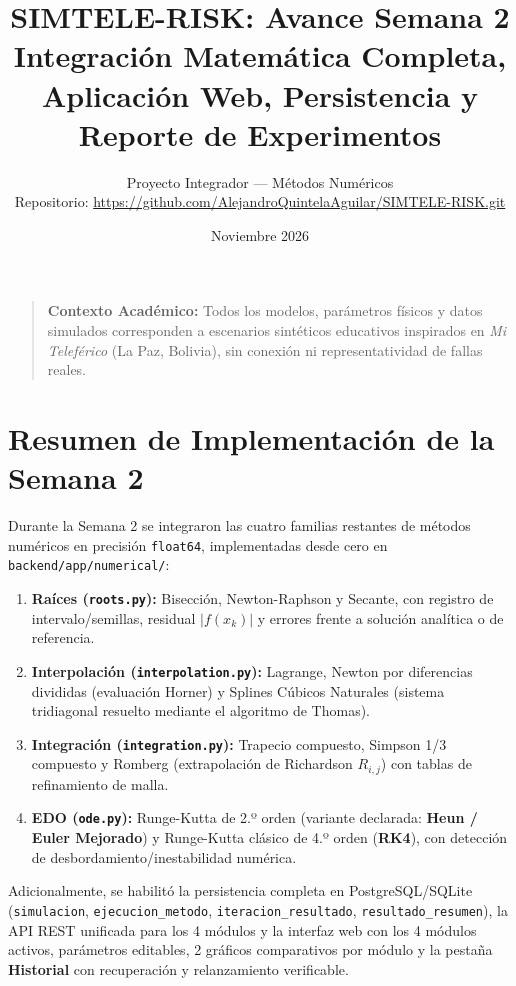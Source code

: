 \documentclass[11pt,a4paper]{article}
\title{\textbf{SIMTELE-RISK: Avance Semana 2} \\
\large Integración Matemática Completa, Aplicación Web, Persistencia y Reporte de Experimentos}
\author{Proyecto Integrador — Métodos Numéricos \\
Repositorio: \url{https://github.com/AlejandroQuintelaAguilar/SIMTELE-RISK.git}}
\date{Noviembre 2026}
\begin{document}
\maketitle

\begin{quote}
\textbf{Contexto Académico:} Todos los modelos, parámetros físicos y datos simulados corresponden a escenarios sintéticos educativos inspirados en \textit{Mi Teleférico} (La Paz, Bolivia), sin conexión ni representatividad de fallas reales.
\end{quote}

\tableofcontents
\newpage

\section{Resumen de Implementación de la Semana 2}
Durante la Semana 2 se integraron las cuatro familias restantes de métodos numéricos en precisión \texttt{float64}, implementadas desde cero en \texttt{backend/app/numerical/}:
\begin{enumerate}
    \item \textbf{Raíces (\texttt{roots.py}):} Bisección, Newton-Raphson y Secante, con registro de intervalo/semillas, residual $|f(x_k)|$ y errores frente a solución analítica o de referencia.
    \item \textbf{Interpolación (\texttt{interpolation.py}):} Lagrange, Newton por diferencias divididas (evaluación Horner) y Splines Cúbicos Naturales (sistema tridiagonal resuelto mediante el algoritmo de Thomas).
    \item \textbf{Integración (\texttt{integration.py}):} Trapecio compuesto, Simpson 1/3 compuesto y Romberg (extrapolación de Richardson $R_{i,j}$) con tablas de refinamiento de malla.
    \item \textbf{EDO (\texttt{ode.py}):} Runge-Kutta de 2.º orden (variante declarada: \textbf{Heun / Euler Mejorado}) y Runge-Kutta clásico de 4.º orden (\textbf{RK4}), con detección de desbordamiento/inestabilidad numérica.
\end{enumerate}

Adicionalmente, se habilitó la persistencia completa en PostgreSQL/SQLite (\texttt{simulacion}, \texttt{ejecucion\_metodo}, \texttt{iteracion\_resultado}, \texttt{resultado\_resumen}), la API REST unificada para los 4 módulos y la interfaz web con los 4 módulos activos, parámetros editables, 2 gráficos comparativos por módulo y la pestaña \textbf{Historial} con recuperación y relanzamiento verificable.
\end{document}
